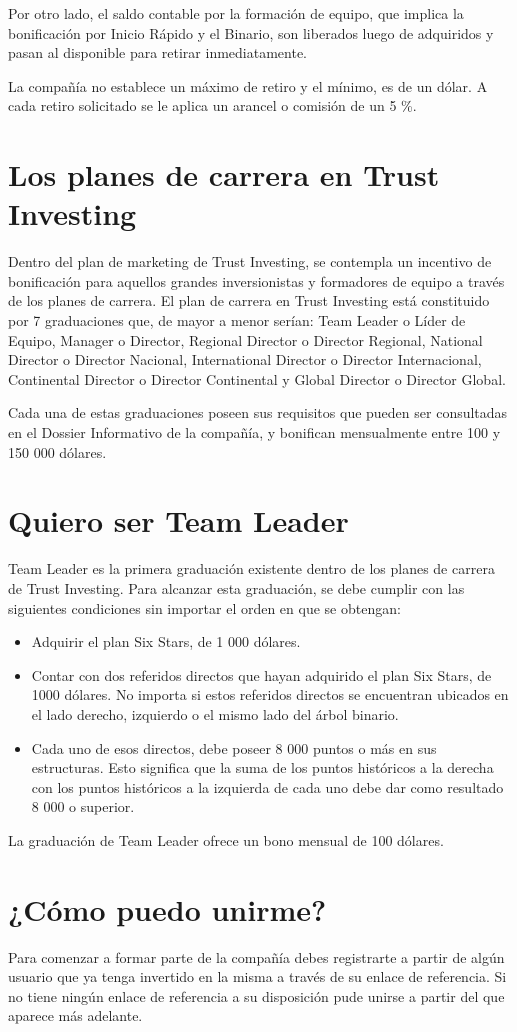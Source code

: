 \documentclass[12pt,letterpaper]{article}
\begin{document}
   Por otro lado, el saldo contable por la formación de equipo, que implica la bonificación por Inicio Rápido y el Binario, son liberados luego de adquiridos y pasan al disponible para retirar inmediatamente. 
   
   La compañía no establece un máximo de retiro y el mínimo, es de un dólar. A cada retiro solicitado se le aplica un arancel o comisión de un 5 \%.
   
   \section{Los planes de carrera en Trust Investing}
   Dentro del plan de marketing de Trust Investing, se contempla un incentivo de bonificación para aquellos grandes inversionistas y formadores de equipo a través de los planes de carrera. El plan de carrera en Trust Investing está constituido por 7 graduaciones que, de mayor a menor serían: Team Leader o Líder de Equipo, Manager o Director, Regional Director o Director Regional, National Director o Director Nacional, International Director o Director Internacional, Continental Director o Director Continental y Global Director o Director Global.
   
   Cada una de estas graduaciones poseen sus requisitos que pueden ser consultadas en el Dossier Informativo de la compañía, y bonifican mensualmente entre 100 y 150 000 dólares.
   
   \section{Quiero ser Team Leader}
   Team Leader es la primera graduación existente dentro de los planes de carrera de Trust Investing. Para alcanzar esta graduación, se debe cumplir con las siguientes condiciones sin importar el orden en que se obtengan:
   
   \begin{itemize}
   	\item Adquirir el plan Six Stars, de 1 000 dólares.
   	\item Contar con dos referidos directos que hayan adquirido el plan Six Stars, de 1000 dólares. No importa si estos referidos directos se encuentran ubicados en el lado derecho, izquierdo o el mismo lado del árbol binario.
   	\item Cada uno de esos directos, debe poseer 8 000 puntos o más en sus estructuras. Esto significa que la suma de los puntos históricos a la derecha con los puntos históricos a la izquierda de cada uno debe dar como resultado 8 000 o superior.
   \end{itemize}
        
   La graduación de Team Leader ofrece un bono mensual de 100 dólares.
   
   \section{¿Cómo puedo unirme?}
   Para comenzar a formar parte de la compañía debes registrarte a partir de algún usuario que ya tenga invertido en la misma a través de su enlace de referencia. Si no tiene ningún enlace de referencia a su disposición pude unirse a partir del que aparece más adelante.
   
   
\end{document}
